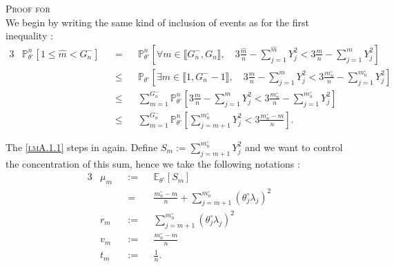 \begin{pro}{\textsc{Proof for } \\}
We begin by writing the same kind of inclusion of events as for the first inequality :
\begin{alignat*}{3}
& \mathds{P}_{\theta^{\circ}}^{n} \left[1 \leq \widehat{m} < G_{n}^{-}\right] &&=&& \mathds{P}_{\theta^{\circ}}^{n} \left[ \forall m \in \llbracket G_{n}^{-}, G_{n} \rrbracket, \quad 3 \frac{\widehat{m}}{n} - \sum\limits_{j = 1}^{\widehat{m}} Y_{j}^{2} < 3 \frac{m}{n} - \sum\limits_{j = 1}^{m} Y_{j}^{2}\right]\\
& && \leq && \mathds{P}_{\theta^{\circ}} \left[ \exists m \in \llbracket 1, G_{n}^{-} -1 \rrbracket, \quad 3 \frac{m}{n} - \sum\limits_{j = 1}^{m} Y_{j}^{2} < 3 \frac{m_{n}^{\circ}}{n} - \sum\limits_{j = 1}^{m_{n}^{\circ}} Y_{j}^{2}\right]\\
& &&\leq&& \sum\limits_{m = 1}^{G_{n}^{-}} \mathds{P}_{\theta^{\circ}}^{n} \left[3 \frac{m}{n} - \sum\limits_{j = 1}^{m} Y_{j}^{2} < 3 \frac{m_{n}^{\circ}}{n} - \sum\limits_{j = 1}^{m_{n}^{\circ}} Y_{j}^{2}\right]\\
& &&\leq&& \sum\limits_{m = 1}^{G_{n}^{-}} \mathds{P}_{\theta^{\circ}}^{n} \left[\sum\limits_{j = m + 1}^{m_{n}^{\circ}} Y_{j}^{2} < 3 \frac{m_{n}^{\circ} - m}{n} \right].
\end{alignat*}

The \textsc{\cref{lmA.1.1}} steps in again.
Define $S_{m} := \sum\limits_{j = m + 1}^{m_{n}^{\circ}} Y_{j}^{2}$ and we want to control the concentration of this sum, hence we take the following notations :
\begin{alignat*}{3}
& \mu_{m} &&:=&& \mathds{E}_{\theta^{\circ}}\left[S_{m}\right]\\
& &&=&& \frac{m_{n}^{\circ} - m}{n} + \sum\limits_{j = m+1}^{m_{n}^{\circ}}\left(\theta^{\circ}_{j}\lambda_{j}\right)^{2}\\
&r_{m} &&:=&& \sum\limits_{j = m+1}^{m_{n}^{\circ}}\left(\theta^{\circ}_{j}\lambda_{j}\right)^{2}\\
&v_{m} &&:=&& \frac{m_{n}^{\circ} - m}{n}\\
&t_{m} &&:=&& \frac{1}{n}.
\end{alignat*}


\end{pro}
